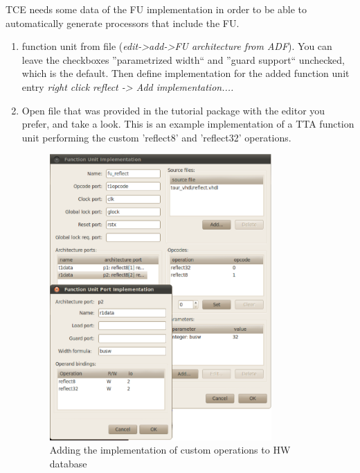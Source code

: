 \documentclass[twoside]{tceusermanual}
\begin{document}
TCE needs some data of the FU implementation in order to be able to 
automatically generate processors that include the FU. \\
\begin{enumerate}
 \item%
 function unit from  file (\textit{edit->add->FU
 architecture from ADF}).  You can leave the checkboxes ''parametrized
 width`` and ''guard support`` unchecked, which is the default.  Then
 define implementation for the added function unit entry \textit{right
 click reflect -> Add implementation....}\\

\item%
Open file  that was provided in the tutorial
package with the editor  you prefer, and take a look. This is an example
implementation of  a TTA function unit performing the custom 'reflect8'
and 'reflect32' operations.

\begin{figure}
  \begin{center} \includegraphics[width=0.8\textwidth]{eps/hdbeditor_scrshot}
  \caption{Adding the implementation of custom operations to HW database} 
  \label{fig:hdbed} \end{center}
\end{figure}


\end{enumerate}
\end{document}
